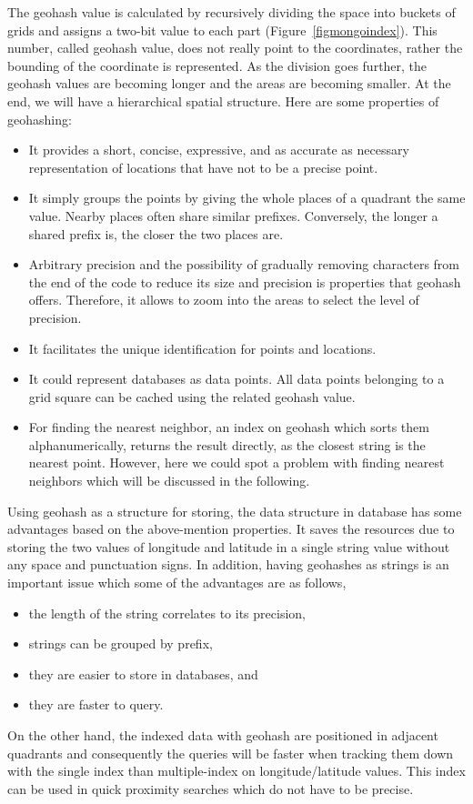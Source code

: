 \documentclass[a4paper,12pt]{article}
\begin{document}
The geohash value is calculated by recursively dividing the space into buckets of grids and assigns a two-bit value to each part (Figure~\ref{figmongoindex}). This number, called geohash value, does not really point to the coordinates, rather the bounding of the coordinate is represented. 
As the division goes further, the geohash values are becoming longer and the areas are becoming smaller. 
At the end, we will have a hierarchical spatial structure. Here are some properties of geohashing:
\begin{itemize}
\item It provides a short, concise, expressive, and as accurate as necessary representation of locations that have not to be a precise point.
\item It simply groups the points by giving the whole places of a quadrant the same value. Nearby places often share similar prefixes. Conversely, the longer a shared prefix is, the closer the two places are. 
\item Arbitrary precision and the possibility of gradually removing characters from the end of the code to reduce its size and precision is properties that geohash offers. Therefore, it allows to zoom into the areas to select the level of precision.
\item It facilitates the unique identification for points and locations.
\item It could represent databases as data points. All data points belonging to a grid square can be cached using the related geohash value.
\item For finding the nearest neighbor, an index on geohash which sorts them alphanumerically, returns the result directly, as the closest string is the nearest point. However, here we could spot a problem with finding nearest neighbors which will be discussed in the following.
\end{itemize}

Using geo\-hash as a structure for storing, the data structure in database has some advantages based on the above-mention properties. It saves the resources due to storing the two values of longitude and latitude in a single string value without any space and punctuation signs. 
In addition, having geohashes as strings is an important issue which some of the advantages are as follows, 
\begin{itemize}
\item the length of the string correlates to its precision,
\item strings can be grouped by prefix,
\item they are easier to store in databases, and
\item they are faster to query. 
\end{itemize}
On the other hand, the indexed data with geohash are positioned in adjacent quadrants and consequently the queries will be faster when tracking them down with the single index than multiple-index on longitude/latitude values. This index can be used in quick proximity searches which do not have to be precise.
\end{document}
